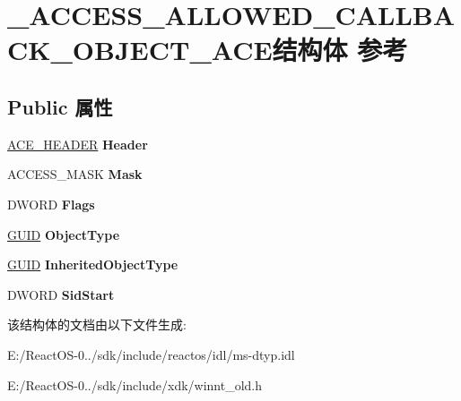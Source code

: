 \hypertarget{struct___a_c_c_e_s_s___a_l_l_o_w_e_d___c_a_l_l_b_a_c_k___o_b_j_e_c_t___a_c_e}{}\section{\+\_\+\+A\+C\+C\+E\+S\+S\+\_\+\+A\+L\+L\+O\+W\+E\+D\+\_\+\+C\+A\+L\+L\+B\+A\+C\+K\+\_\+\+O\+B\+J\+E\+C\+T\+\_\+\+A\+C\+E结构体 参考}
\label{struct___a_c_c_e_s_s___a_l_l_o_w_e_d___c_a_l_l_b_a_c_k___o_b_j_e_c_t___a_c_e}
\subsection*{Public 属性}
\begin{DoxyCompactItemize}
\item 
\mbox{\label{struct___a_c_c_e_s_s___a_l_l_o_w_e_d___c_a_l_l_b_a_c_k___o_b_j_e_c_t___a_c_e_a1c719361794dd3df85f21734121011b8}} 
\hyperlink{struct___a_c_e___h_e_a_d_e_r}{A\+C\+E\+\_\+\+H\+E\+A\+D\+ER} {\bfseries Header}
\item 
\mbox{\label{struct___a_c_c_e_s_s___a_l_l_o_w_e_d___c_a_l_l_b_a_c_k___o_b_j_e_c_t___a_c_e_aa458dbbe29806ac4175ae1c9fbffc75c}} 
A\+C\+C\+E\+S\+S\+\_\+\+M\+A\+SK {\bfseries Mask}
\item 
\mbox{\label{struct___a_c_c_e_s_s___a_l_l_o_w_e_d___c_a_l_l_b_a_c_k___o_b_j_e_c_t___a_c_e_a7bdbe96af37a8a8e7a4663b1b1bfe39b}} 
D\+W\+O\+RD {\bfseries Flags}
\item 
\mbox{\label{struct___a_c_c_e_s_s___a_l_l_o_w_e_d___c_a_l_l_b_a_c_k___o_b_j_e_c_t___a_c_e_a22063d19feabdb3ae5e759a9892e198f}} 
\hyperlink{interface_g_u_i_d}{G\+U\+ID} {\bfseries Object\+Type}
\item 
\mbox{\label{struct___a_c_c_e_s_s___a_l_l_o_w_e_d___c_a_l_l_b_a_c_k___o_b_j_e_c_t___a_c_e_ab9cec29b338529f48280882aaaba0de0}} 
\hyperlink{interface_g_u_i_d}{G\+U\+ID} {\bfseries Inherited\+Object\+Type}
\item 
\mbox{\label{struct___a_c_c_e_s_s___a_l_l_o_w_e_d___c_a_l_l_b_a_c_k___o_b_j_e_c_t___a_c_e_aa0287536ab61e18da45a7461c8d1c9a1}} 
D\+W\+O\+RD {\bfseries Sid\+Start}
\end{DoxyCompactItemize}


该结构体的文档由以下文件生成\+:\begin{DoxyCompactItemize}
\item 
E\+:/\+React\+O\+S-\/0../sdk/include/reactos/idl/ms-\/dtyp.\+idl\item 
E\+:/\+React\+O\+S-\/0../sdk/include/xdk/winnt\+\_\+old.\+h\end{DoxyCompactItemize}

